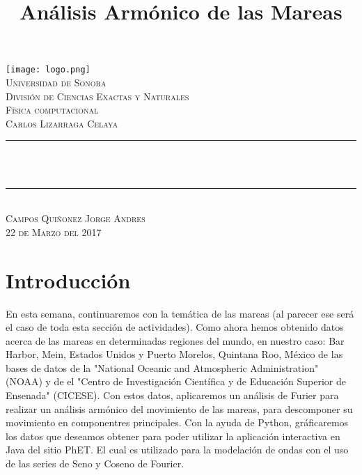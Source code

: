 \documentclass{article}
\title{Análisis Armónico de las Mareas}
\makeatletter
\let\thetitle\@title
\makeatother
\begin{document}
\begin{titlepage}
\centering
  \vspace*{0.5 cm}
   \texttt{[image: logo.png]}\\[0.5 cm]%
    \textsc{\LARGE Universidad de Sonora}\\[1.0 cm]	%
	\textsc{\LARGE División de Ciencias Exactas y Naturales}\\[0.5 cm]	
    
	\textsc{\LARGE Física computacional}\\
    \textsc{\Large Carlos Lizarraga Celaya}\\ [0.5 cm]
    \rule{\linewidth}{0.2 mm} \\[0.4 cm]
	{ \huge \bfseries \thetitle}\\
	\rule{\linewidth}{0.2 mm} \\[0.5 cm]
    \textsc{\Large Campos Quiñonez Jorge Andres} \\[0.25 cm]
   \textsc {\large 22 de Marzo del 2017} 	

	
 
	\vfill
	
\end{titlepage}
\pagebreak

\newpage

\pagebreak
\tableofcontents
\pagebreak
\onehalfspacing

\section*{\LARGE Introducción}
\large En esta semana, continuaremos con la temática de las mareas (al parecer ese será el caso de toda esta sección de actividades). Como ahora hemos obtenido datos acerca de las mareas en determinadas regiones del mundo, en nuestro caso: Bar Harbor, Mein, Estados Unidos y Puerto Morelos, Quintana Roo, México de las bases de datos de la "National Oceanic and Atmospheric Administration" (NOAA) y de el "Centro de Investigación Científica y de Educación Superior de Ensenada" (CICESE). Con estos datos, aplicaremos un análisis de Furier para realizar un análisis armónico del movimiento de las mareas, para descomponer su movimiento en componentres principales. Con la ayuda de Python, gráficaremos los datos que deseamos obtener para poder utilizar la aplicación interactiva en Java del sitio PhET. El cual es utilizado para la modelación de ondas con el uso de las series de Seno y Coseno de Fourier.
\pagebreak
\end{document}
